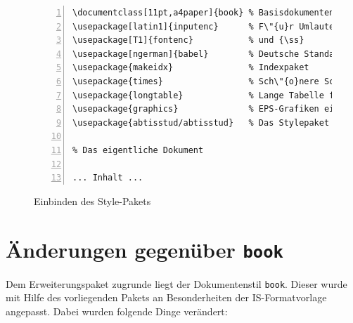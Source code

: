 \begin{figure}[ht]
\centering
\begin{Verbatim}[label=dissertation.tex,numberblanklines=false,fontsize=\scriptsize,numbers=left,frame=single]
\documentclass[11pt,a4paper]{book} % Basisdokumentenklasse
\usepackage[latin1]{inputenc}      % F\"{u}r Umlaute
\usepackage[T1]{fontenc}           % und {\ss}
\usepackage[ngerman]{babel}        % Deutsche Standardbezeichner und Trennung
\usepackage{makeidx}               % Indexpaket
\usepackage{times}                 % Sch\"{o}nere Schriften
\usepackage{longtable}             % Lange Tabelle f\"{u}r Abk\"{u}rzungsverzeichnis
\usepackage{graphics}              % EPS-Grafiken einbinden
\usepackage{abtisstud/abtisstud}   % Das Stylepaket am Ende einbinden!

% Das eigentliche Dokument

... Inhalt ...

\end{Verbatim}
\caption{Einbinden des Style-Pakets}\label{stylepaket}
\end{figure}


\section{\"{A}nderungen gegen\"{u}ber \texttt{book}}
Dem Erweiterungspaket zugrunde liegt der Dokumentenstil
\texttt{book}. Dieser wurde mit Hilfe des vorliegenden Pakets an
Besonderheiten der IS-Formatvorlage angepasst. Dabei wurden
folgende Dinge ver\"{a}ndert:

